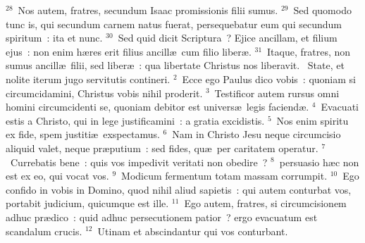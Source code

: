 ${}^{28}$~Nos autem, fratres, secundum Isaac promissionis filii sumus.
${}^{29}$~Sed quomodo tunc is, qui secundum carnem natus fuerat, persequebatur eum qui secundum spiritum~: ita et nunc.
${}^{30}$~Sed quid dicit Scriptura~? Ejice ancillam, et filium ejus~: non enim h\ae res erit filius ancill\ae\ cum filio liber\ae .
${}^{31}$~Itaque, fratres, non sumus ancill\ae\ filii, sed liber\ae~: qua libertate Christus nos liberavit.
~State, et nolite iterum jugo servitutis contineri.
${}^{2}$~Ecce ego Paulus dico vobis~: quoniam si circumcidamini, Christus vobis nihil proderit.
${}^{3}$~Testificor autem rursus omni homini circumcidenti se, quoniam debitor est univers\ae\ legis faciend\ae .
${}^{4}$~Evacuati estis a Christo, qui in lege justificamini~: a gratia excidistis.
${}^{5}$~Nos enim spiritu ex fide, spem justiti\ae\ exspectamus.
${}^{6}$~Nam in Christo Jesu neque circumcisio aliquid valet, neque pr\ae putium~: sed fides, qu\ae\ per caritatem operatur.
${}^{7}$~Currebatis bene~: quis vos impedivit veritati non obedire~?
${}^{8}$~persuasio h\ae c non est ex eo, qui vocat vos.
${}^{9}$~Modicum fermentum totam massam corrumpit.
${}^{10}$~Ego confido in vobis in Domino, quod nihil aliud sapietis~: qui autem conturbat vos, portabit judicium, quicumque est ille.
${}^{11}$~Ego autem, fratres, si circumcisionem adhuc pr\ae dico~: quid adhuc persecutionem patior~? ergo evacuatum est scandalum crucis.
${}^{12}$~Utinam et abscindantur qui vos conturbant.


